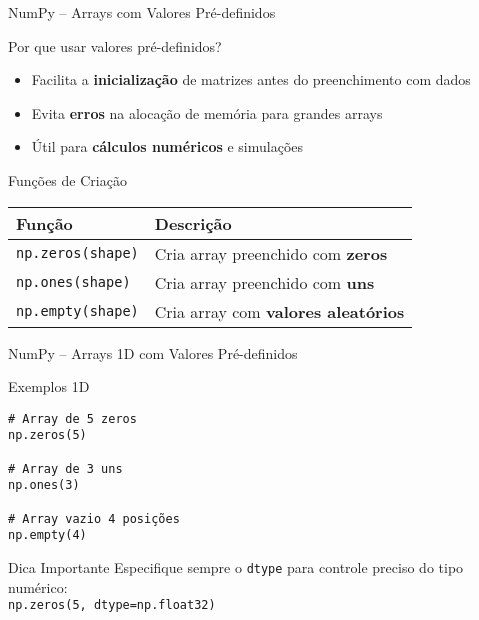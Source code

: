 \begin{frame}[fragile]{NumPy – Arrays com Valores Pré-definidos}

    \begin{block}{Por que usar valores pré-definidos?}
        \begin{itemize}
            \item Facilita a \textbf{inicialização} de matrizes antes do preenchimento com dados
            \item Evita \textbf{erros} na alocação de memória para grandes arrays
            \item Útil para \textbf{cálculos numéricos} e simulações

        \end{itemize}
    \end{block}

    \begin{block}{Funções de Criação}
        \begin{tabular}{ll}
            \textbf{Função}          & \textbf{Descrição}                         \\
            \hline
            \texttt{np.zeros(shape)} & Cria array preenchido com \textbf{zeros}   \\
            \texttt{np.ones(shape)}  & Cria array preenchido com \textbf{uns}     \\
            \texttt{np.empty(shape)} & Cria array com \textbf{valores aleatórios} \\
        \end{tabular}
    \end{block}

\end{frame}

\begin{frame}[fragile]{NumPy – Arrays 1D com Valores Pré-definidos}
    \begin{exampleblock}{Exemplos 1D}
        \begin{verbatim}
# Array de 5 zeros
np.zeros(5)

# Array de 3 uns
np.ones(3)

# Array vazio 4 posições
np.empty(4)
\end{verbatim}
    \end{exampleblock}

    \begin{alertblock}{Dica Importante}
        Especifique sempre o \texttt{dtype} para controle preciso do tipo numérico:\\
        \texttt{np.zeros(5, dtype=np.float32)}
    \end{alertblock}
\end{frame}

